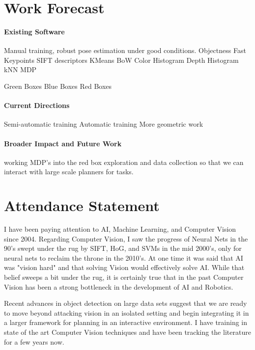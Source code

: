\documentclass[12pt]{article}
\numberwithin{equation}{section}
\numberwithin{table}{section}
\numberwithin{figure}{section}
\begin{document}
\section{Work Forecast}

\paragraph{Existing Software}
Manual training, robust pose estimation under good conditions.
Objectness
Fast Keypoints
SIFT descriptors
KMeans
BoW
Color Histogram
Depth Histogram
kNN
MDP

Green Boxes
Blue Boxes
Red Boxes

\paragraph{Current Directions}
Semi-automatic training
Automatic training
More geometric work

\paragraph{Broader Impact and Future Work}
working MDP's into the red box exploration and data collection so that we can interact with
large scale planners for tasks.


%
%

\newpage

\section{Attendance Statement}

  I have been paying attention to AI, Machine Learning, and Computer Vision since 2004. 
Regarding Computer Vision, I saw the progress of Neural Nets in the 90's swept under 
the rug by SIFT, HoG, and SVMs in the mid 2000's, only for neural nets to reclaim the throne in the 2010's.
At one time it was said that AI was "vision hard" and that solving Vision would
effectively solve AI. While that belief sweeps a bit under the rug, it is certainly true
that in the past Computer Vision has been a strong bottleneck in the development of AI and 
Robotics. 
  
  Recent advances in object detection on large data sets suggest that we are ready
to move beyond attacking vision in an isolated setting and begin integrating it in a
larger framework for planning in an interactive environment. I have training in state
of the art Computer Vision techniques and have been tracking the literature for a few
years now. 
\end{document}
